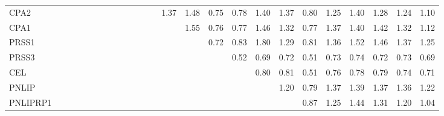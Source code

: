 \begin{longtable}{lrrrrrrrrrrrrrrrrrrrrrrrr}
CPA2     &              &              &              &              &             &             &             &             &            &              &            &            &       1.37 &        1.48 &        0.75 &      0.78 &        1.40 &           1.37 &      0.80 &          1.25 &      1.40 &        1.28 &        1.24 &       1.10 \\
CPA1     &              &              &              &              &             &             &             &             &            &              &            &            &            &        1.55 &        0.76 &      0.77 &        1.46 &           1.32 &      0.77 &          1.37 &      1.40 &        1.42 &        1.32 &       1.12 \\
PRSS1    &              &              &              &              &             &             &             &             &            &              &            &            &            &             &        0.72 &      0.83 &        1.80 &           1.29 &      0.81 &          1.36 &      1.52 &        1.46 &        1.37 &       1.25 \\
PRSS3    &              &              &              &              &             &             &             &             &            &              &            &            &            &             &             &      0.52 &        0.69 &           0.72 &      0.51 &          0.73 &      0.74 &        0.72 &        0.73 &       0.69 \\
CEL      &              &              &              &              &             &             &             &             &            &              &            &            &            &             &             &           &        0.80 &           0.81 &      0.51 &          0.76 &      0.78 &        0.79 &        0.74 &       0.71 \\
PNLIP    &              &              &              &              &             &             &             &             &            &              &            &            &            &             &             &           &             &           1.20 &      0.79 &          1.37 &      1.39 &        1.37 &        1.36 &       1.22 \\
PNLIPRP1 &              &              &              &              &             &             &             &             &            &              &            &            &            &             &             &           &             &                &      0.87 &          1.25 &      1.44 &        1.31 &        1.20 &       1.04 \\

\end{longtable}
